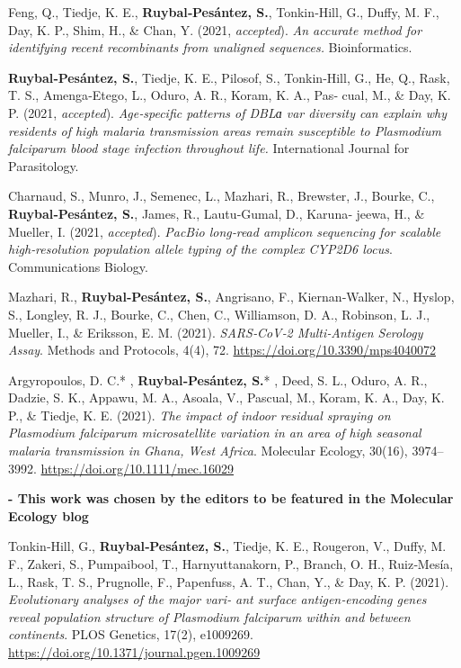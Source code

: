 \documentclass[11pt,a4paper,]{awesome-cv}
\begin{document}
Feng, Q., Tiedje, K. E., \textbf{Ruybal‐Pesántez, S.}, Tonkin‐Hill, G.,
Duffy, M. F., Day, K. P., Shim, H., \& Chan, Y. (2021, \emph{accepted}).
\emph{An accurate method for identifying recent recombinants from
unaligned sequences.} Bioinformatics.

\textbf{Ruybal‐Pesántez, S.}, Tiedje, K. E., Pilosof, S., Tonkin‐Hill,
G., He, Q., Rask, T. S., Amenga‐Etego, L., Oduro, A. R., Koram, K. A.,
Pas‐ cual, M., \& Day, K. P. (2021, \emph{accepted}). \emph{Age‐specific
patterns of DBLɑ var diversity can explain why residents of high malaria
transmission areas remain susceptible to Plasmodium falciparum blood
stage infection throughout life.} International Journal for
Parasitology.

Charnaud, S., Munro, J., Semenec, L., Mazhari, R., Brewster, J., Bourke,
C., \textbf{Ruybal‐Pesántez, S.}, James, R., Lautu‐Gumal, D., Karuna‐
jeewa, H., \& Mueller, I. (2021, \emph{accepted}). \emph{PacBio
long‐read amplicon sequencing for scalable high‐resolution population
allele typing of the complex CYP2D6 locus}. Communications Biology.

Mazhari, R., \textbf{Ruybal‐Pesántez, S.}, Angrisano, F.,
Kiernan‐Walker, N., Hyslop, S., Longley, R. J., Bourke, C., Chen, C.,
Williamson, D. A., Robinson, L. J., Mueller, I., \& Eriksson, E. M.
(2021). \emph{SARS‐CoV‐2 Multi‐Antigen Serology Assay}. Methods and
Protocols, 4(4), 72. \url{https://doi.org/10.3390/mps4040072}

Argyropoulos, D. C.* , \textbf{Ruybal‐Pesántez, S.}* , Deed, S. L.,
Oduro, A. R., Dadzie, S. K., Appawu, M. A., Asoala, V., Pascual, M.,
Koram, K. A., Day, K. P., \& Tiedje, K. E. (2021). \emph{The impact of
indoor residual spraying on Plasmodium falciparum microsatellite
variation in an area of high seasonal malaria transmission in Ghana,
West Africa}. Molecular Ecology, 30(16), 3974--3992.
\url{https://doi.org/10.1111/mec.16029}

\setlength{\leftskip}{2cm}

\textbf{- This work was chosen by the editors to be featured in the
Molecular Ecology blog
\href{https://molecularecologyblog.com/2021/09/01/interview-with-the-authors-does-indoor-spraying-alter-the-genetic-diversity-of-malaria-causing-parasites-and-what-does-this-mean-for-long-term-control/}{\faExternalLink}}

\setlength{\leftskip}{1cm}

Tonkin‐Hill, G., \textbf{Ruybal‐Pesántez, S.}, Tiedje, K. E., Rougeron,
V., Duffy, M. F., Zakeri, S., Pumpaibool, T., Harnyuttanakorn, P.,
Branch, O. H., Ruiz‐Mesía, L., Rask, T. S., Prugnolle, F., Papenfuss, A.
T., Chan, Y., \& Day, K. P. (2021). \emph{Evolutionary analyses of the
major vari‐ ant surface antigen‐encoding genes reveal population
structure of Plasmodium falciparum within and between continents}. PLOS
Genetics, 17(2), e1009269.
\url{https://doi.org/10.1371/journal.pgen.1009269}
\end{document}
